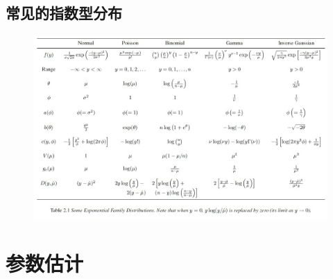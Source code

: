 \documentclass[professionalfont]{beamer}
\begin{document}
\subsection{常见的指数型分布}
\begin{frame}\label{table}
	\begin{figure}
		\includegraphics[width=\textwidth]{Plots/GLM.jpg}
	\end{figure}
\end{frame}
\section{参数估计}
\end{document}
